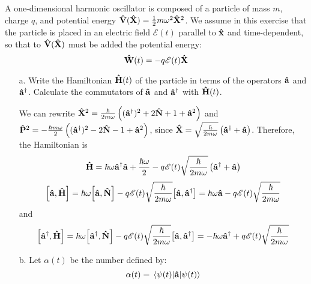 \documentclass[a4paper,twoside]{article}
\begin{document}
A one-dimensional harmonic oscillator is composed of a particle of mass $ m $, charge $ q $, and potential energy $ \vu{V}(\vu{X}) = \frac{1}{2} m \omega^2 \vu{X}^2 $. We assume in this exercise that the particle is placed in an electric field $ \mathscr{E}(t) $ parallel to $ \vu{x} $ and time-dependent, so that to $ \vu{V}(\vu{X}) $ must be added the potential energy:
\begin{equation}
    \vu{W}(t) = - q \mathscr{E}(t) \vu{X}
\end{equation}
\begin{itemize}
    \item[a.] Write the Hamiltonian $ \vu{H}(t) $ of the particle in terms of the operators $ \vu{a} $ and $ \vu{a}^\dagger $. Calculate the commutators of $ \vu{a} $ and $ \vu{a}^\dagger $ with $ \vu{H}(t) $.
        \begin{problem}
            We can rewrite $ \vu{X}^2 = \frac{\hbar}{2m \omega} \left( (\vu{a}^\dagger)^2 + 2\vu{N} + 1 + \vu{a}^2 \right) $ and $ \vu{P}^2 = - \frac{\hbar m \omega}{2} \left( (\vu{a}^\dagger)^2 - 2 \vu{N} - 1 + \vu{a}^2 \right) $, since $ \vu{X} = \sqrt{\frac{\hbar}{2 m \omega}} \left( \vu{a}^\dagger + \vu{a} \right) $. Therefore, the Hamiltonian is
            \begin{equation}
                \vu{H} = \hbar \omega \vu{a}^\dagger \vu{a} + \frac{\hbar \omega}{2} - q \mathscr{E}(t) \sqrt{\frac{\hbar}{2m \omega}} \left( \vu{a}^\dagger + \vu{a} \right)
            \end{equation}
            \begin{equation}
                \comm{ \vu{a}}{ \vu{H}} = \hbar \omega \comm{ \vu{a}}{ \vu{N}} - q \mathscr{E}(t) \sqrt{\frac{\hbar}{2m \omega}} \comm{ \vu{a}}{ \vu{a}^\dagger} = \hbar \omega \vu{a} - q \mathscr{E}(t) \sqrt{\frac{\hbar}{2m \omega}}
            \end{equation}
            and
            \begin{equation}
                \comm{ \vu{a}^\dagger}{ \vu{H}} = \hbar \omega \comm{ \vu{a}^\dagger}{ \vu{N}} - q \mathscr{E}(t) \sqrt{\frac{\hbar}{2m \omega}} \comm{ \vu{a}}{ \vu{a}^\dagger} = - \hbar \omega \vu{a}^\dagger + q \mathscr{E}(t) \sqrt{\frac{\hbar}{2m \omega}} 
            \end{equation}
        \end{problem}
    \item[b.] Let $ \alpha(t) $ be the number defined by:
        \begin{equation}
            \alpha(t) = \ev{\vu{a}}{\psi(t)}

\end{equation}
\end{itemize}
\end{document}
